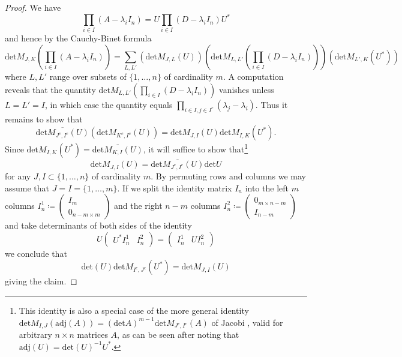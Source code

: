 \documentclass[12pt]{amsart}
\begin{document}
\begin{proof}  We have 
$$\prod_{i \in I} (A - \lambda_i I_n) = U \prod_{i \in I} (D - \lambda_i I_n) U^*$$
and hence by the Cauchy-Binet formula 
$$\mathrm{det} M_{J,K}( \prod_{i \in I} (A - \lambda_i I_n) ) = \sum_{L,L'} (\mathrm{det} M_{J,L}(U))
(\mathrm{det} M_{L,L'}(\prod_{i \in I} (D - \lambda_i I_n))) (\mathrm{det} M_{L',K}(U^*))$$
where $L,L'$ range over subsets of $\{1,\dots,n\}$ of cardinality $m$.  A computation reveals that the quantity $\mathrm{det} M_{L,L'}(\prod_{i \in I} (D - \lambda_i I_n))$ vanishes unless $L=L'=I$, in which case the quantity equals $\prod_{i \in I, j \in I^c} (\lambda_j - \lambda_i)$.  Thus it remains to show that
$$ \overline{\mathrm{det} M_{J^c,I^c}(U)} (\mathrm{det} M_{K^c,I^c}(U)) = \mathrm{det} M_{J,I}(U) \mathrm{det} M_{I,K}(U^*).$$
Since $\mathrm{det} M_{I,K}(U^*) = \overline{\mathrm{det} M_{K,I}(U)}$, it will suffice to show that\footnote{This identity is also a special case of the more general identity $\mathrm{det} M_{I,J}(\mathrm{adj}(A)) = (\mathrm{det} A)^{m-1} \mathrm{det} M_{J^c,I^c}(A)$ of Jacobi \cite{jacobi}, valid for arbitrary $n \times n$ matrices $A$, as can be seen after noting that $\mathrm{adj}(U) = \mathrm{det}(U)^{-1} U^*$.} 
\begin{equation}\label{duality}
 \mathrm{det} M_{J,I}(U) = \overline{\mathrm{det} M_{J^c,I^c}(U)} \mathrm{det} U
\end{equation}
for any $J,I \subset \{1,\dots,n\}$ of cardinality $m$.  By permuting rows and columns we may assume that $J=I=\{1,\dots,m\}$.  If we split the identity matrix $I_n$ into the left $m$ columns $I_n^1 \coloneqq \begin{pmatrix} I_m \\ 0_{n-m \times m} \end{pmatrix}$ and the right $n-m$ columns $I_n^2 \coloneqq \begin{pmatrix} 0_{m \times n-m} \\ I_{n-m} \end{pmatrix}$ and take determinants of both sides of the identity
$$ U \begin{pmatrix} U^* I_n^1 & I_n^2 \end{pmatrix} = \begin{pmatrix} I_n^1 & UI_n^2 \end{pmatrix}$$
we conclude that
$$ \mathrm{det}(U) \mathrm{det} M_{I^c,J^c}(U^*) = \mathrm{det} M_{J,I}(U)$$
giving the claim.
\end{proof}
\end{document}
